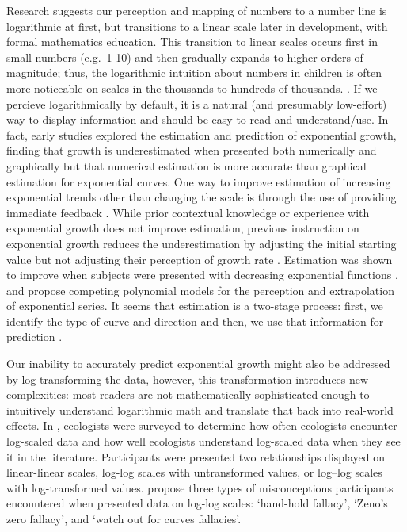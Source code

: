 \documentclass[]{interact}
\theoremstyle{plain}%
\theoremstyle{definition}
\theoremstyle{remark}
\begin{document}
Research suggests our perception and mapping of numbers to a number line
is logarithmic at first, but transitions to a linear scale later in
development, with formal mathematics education. This transition to
linear scales occurs first in small numbers (e.g.~1-10) and then
gradually expands to higher orders of magnitude; thus, the logarithmic
intuition about numbers in children is often more noticeable on scales
in the thousands to hundreds of thousands.
\citep{varshney_why_2013, siegler_numerical_2017, dehaeneLogLinearDistinct2008}.
If we percieve logarithmically by default, it is a natural (and
presumably low-effort) way to display information and should be easy to
read and understand/use. In fact, early studies explored the estimation
and prediction of exponential growth, finding that growth is
underestimated when presented both numerically and graphically but that
numerical estimation is more accurate than graphical estimation for
exponential curves. One way to improve estimation of increasing
exponential trends other than changing the scale is through the use of
providing immediate feedback \citep{mackinnon_feedback_1991}. While
prior contextual knowledge or experience with exponential growth does
not improve estimation, previous instruction on exponential growth
reduces the underestimation by adjusting the initial starting value but
not adjusting their perception of growth rate
\citep{wagenaar_misperception_1975, jones_polynomial_1977}. Estimation
was shown to improve when subjects were presented with decreasing
exponential functions \citep{timmers_inverse_1977}.
\citet{jones_polynomial_1977,jones_generalized_1979} and
\citet{wagenaar_extrapolation_1978} propose competing polynomial models
for the perception and extrapolation of exponential series. It seems
that estimation is a two-stage process: first, we identify the type of
curve and direction and then, we use that information for prediction
\citep{best_perception_2007}.

Our inability to accurately predict exponential growth might also be
addressed by log-transforming the data, however, this transformation
introduces new complexities: most readers are not mathematically
sophisticated enough to intuitively understand logarithmic math and
translate that back into real-world effects. In
\citet{menge_logarithmic_2018}, ecologists were surveyed to determine
how often ecologists encounter log-scaled data and how well ecologists
understand log-scaled data when they see it in the literature.
Participants were presented two relationships displayed on linear-linear
scales, log-log scales with untransformed values, or log--log scales
with log-transformed values. \citet{menge_logarithmic_2018} propose
three types of misconceptions participants encountered when presented
data on log-log scales: `hand-hold fallacy', `Zeno's zero fallacy', and
`watch out for curves fallacies'.
\end{document}
